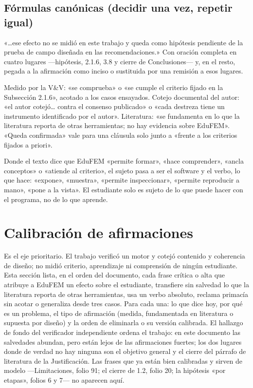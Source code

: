 \subsection*{Fórmulas canónicas (decidir una vez, repetir igual)}
\begin{debedecir}«…ese efecto no se midió en este trabajo y queda como hipótesis pendiente de la prueba de campo diseñada en las recomendaciones.» Con oración completa en cuatro lugares —hipótesis, 2.1.6, 3.8 y cierre de Conclusiones— y, en el resto, pegada a la afirmación como inciso o sustituida por una remisión a esos lugares.\end{debedecir}
\begin{debedecir}Medido por la V\&V: «se comprueba» o «se cumple el criterio fijado en la Subsección 2.1.6», acotado a los casos ensayados. Cotejo documental del autor: «el autor cotejó… contra el consenso publicado» o «cada destreza tiene un instrumento identificado por el autor». Literatura: «se fundamenta en lo que la literatura reporta de otras herramientas; no hay evidencia sobre EduFEM». «Queda confirmada» vale para una cláusula solo junto a «frente a los criterios fijados a priori».\end{debedecir}
\begin{debedecir}Donde el texto dice que EduFEM «permite formar», «hace comprender», «ancla conceptos» o «atiende al criterio», el sujeto pasa a ser el software y el verbo, lo que hace: «expone», «muestra», «permite inspeccionar», «permite reproducir a mano», «pone a la vista». El estudiante solo es sujeto de lo que puede hacer con el programa, no de lo que aprende.\end{debedecir}
\clearpage
\section{Calibración de afirmaciones}
Es el eje prioritario. El trabajo verificó un motor y cotejó contenido y coherencia de diseño; no midió criterio, aprendizaje ni comprensión de ningún estudiante. Esta sección lista, en el orden del documento, cada frase crítica o alta que atribuye a EduFEM un efecto sobre el estudiante, transfiere sin salvedad lo que la literatura reporta de otras herramientas, usa un verbo absoluto, reclama primacía sin acotar o generaliza desde tres casos. Para cada una: lo que dice hoy, por qué es un problema, el tipo de afirmación (medida, fundamentada en literatura o supuesta por diseño) y la orden de eliminarla o su versión calibrada. El hallazgo de fondo del verificador independiente ordena el trabajo: en este documento las salvedades abundan, pero están lejos de las afirmaciones fuertes; los dos lugares donde de verdad no hay ninguna son el objetivo general y el cierre del párrafo de literatura de la Justificación. Las frases que ya están bien calibradas y sirven de modelo —Limitaciones, folio 91; el cierre de 1.2, folio 20; la hipótesis «por etapas», folios 6 y 7— no aparecen aquí.

